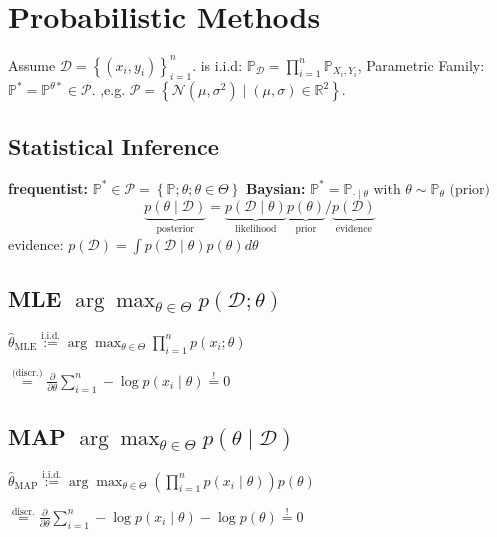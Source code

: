\section*{Probabilistic Methods}

Assume $\mathcal{D} = \left\{ (x_i, y_i) \right\}_{i=1}^{n}.$ is i.i.d: $\mathbb{P}_{\mathcal{D}} = \prod_{i=1}^{n} \mathbb{P}_{X_i, Y_i}
$, 
Parametric Family: $\mathbb{P}^* = \mathbb{P}^{\theta*} \in \mathcal{P}.$  ,e.g. $\mathcal{P} = \left\{ \mathcal{N}(\mu, \sigma^2) \mid (\mu, \sigma) \in \mathbb{R}^2 \right\}.$

\subsection*{Statistical Inference}

\textbf{frequentist:} $\mathbb{P}^* \in \mathcal{P} = \left\{ \mathbb{P}; \theta; \theta \in \Theta \right\}$
\textbf{Baysian:} $\mathbb{P}^* = \mathbb{P}_{\cdot \mid \theta} \text{ with } \theta \sim \mathbb{P}_{\theta} \text{ (prior)}$ \\[-15pt]

\[
\underbrace{p( \theta \mid \mathcal{D})}_{\text{posterior}} = \underbrace{p(\mathcal{D} \mid \theta)}_{\text{likelihood}} \underbrace{p(\theta)}_{\text{prior}} / {\underbrace{p(\mathcal{D})}_{\text{evidence}}}
\] 
evidence: $p(\mathcal{D}) = \int p(\mathcal{D} \mid \theta) p(\theta) d\theta$

\subsection*{MLE \quad \color{black}$\arg \max_{\theta \in \Theta} p(\mathcal{D}; \theta)$} 
$\hat{\theta}_{\text{MLE}} \overset{\text{i.i.d.}}{:=} \arg \max_{\theta \in \Theta} \prod_{i=1}^{n} p(x_i; \theta) $

$\overset{\text{(discr.)}}{=} \frac{\partial}{\partial \theta}
 \sum_{i=1}^{n} -\log p(x_i \mid \theta) \overset{!}{=} 0$

\subsection*{MAP \quad \color{black}$\arg \max_{\theta \in \Theta} p(\theta \mid \mathcal{D})$}
$\hat{\theta}_{\text{MAP}} \overset{\text{i.i.d.}}{:=} \arg \max_{\theta \in \Theta} \left( \prod_{i=1}^{n} p(x_i\mid \theta) \right) p(\theta)$

$\overset{\text{discr.}}{=}  \frac{\partial}{\partial \theta} \sum_{i=1}^{n} -\log p(x_i \mid \theta) - \log p(\theta) \overset{!}{=} 0$ 

